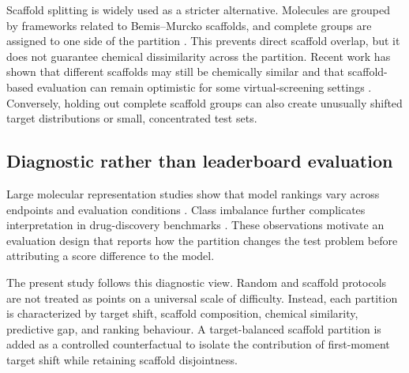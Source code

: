 Scaffold splitting is widely used as a stricter alternative. Molecules are grouped by frameworks related to Bemis--Murcko scaffolds, and complete groups are assigned to one side of the partition \citep{bemis1996properties}. This prevents direct scaffold overlap, but it does not guarantee chemical dissimilarity across the partition. Recent work has shown that different scaffolds may still be chemically similar and that scaffold-based evaluation can remain optimistic for some virtual-screening settings \citep{guo2024scaffold}. Conversely, holding out complete scaffold groups can also create unusually shifted target distributions or small, concentrated test sets.

\subsection{Diagnostic rather than leaderboard evaluation}

Large molecular representation studies show that model rankings vary across endpoints and evaluation conditions \citep{yang2019learned,feinberg2018potentialnet}. Class imbalance further complicates interpretation in drug-discovery benchmarks \citep{li2022imdrug}. These observations motivate an evaluation design that reports how the partition changes the test problem before attributing a score difference to the model.

The present study follows this diagnostic view. Random and scaffold protocols are not treated as points on a universal scale of difficulty. Instead, each partition is characterized by target shift, scaffold composition, chemical similarity, predictive gap, and ranking behaviour. A target-balanced scaffold partition is added as a controlled counterfactual to isolate the contribution of first-moment target shift while retaining scaffold disjointness.
